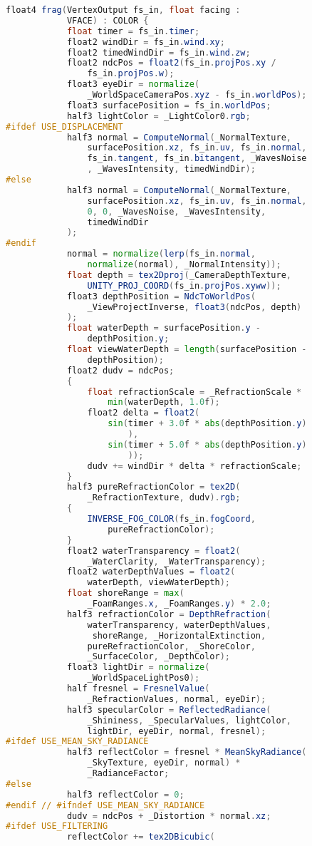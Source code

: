 \begin{lstlisting}[language=GLSL, caption={\label{cf:agua} \textit{Shader} de efeito de água na Unity}]
		float4 frag(VertexOutput fs_in, float facing : 
			VFACE) : COLOR {
			float timer = fs_in.timer;
			float2 windDir = fs_in.wind.xy;
			float2 timedWindDir = fs_in.wind.zw;
			float2 ndcPos = float2(fs_in.projPos.xy / 
				fs_in.projPos.w);
			float3 eyeDir = normalize(
				_WorldSpaceCameraPos.xyz - fs_in.worldPos);
			float3 surfacePosition = fs_in.worldPos;
			half3 lightColor = _LightColor0.rgb;
#ifdef USE_DISPLACEMENT
			half3 normal = ComputeNormal(_NormalTexture, 
				surfacePosition.xz, fs_in.uv, fs_in.normal, 
				fs_in.tangent, fs_in.bitangent, _WavesNoise
				, _WavesIntensity, timedWindDir);
#else
			half3 normal = ComputeNormal(_NormalTexture, 
				surfacePosition.xz, fs_in.uv, fs_in.normal, 
				0, 0, _WavesNoise, _WavesIntensity, 
				timedWindDir
			);
#endif
			normal = normalize(lerp(fs_in.normal, 
				normalize(normal), _NormalIntensity));
			float depth = tex2Dproj(_CameraDepthTexture, 
				UNITY_PROJ_COORD(fs_in.projPos.xyww));
			float3 depthPosition = NdcToWorldPos(
				_ViewProjectInverse, float3(ndcPos, depth)
			);
			float waterDepth = surfacePosition.y - 
				depthPosition.y; 
			float viewWaterDepth = length(surfacePosition - 
				depthPosition); 
			float2 dudv = ndcPos;
			{
				float refractionScale = _RefractionScale * 
					min(waterDepth, 1.0f);
				float2 delta = float2(
					sin(timer + 3.0f * abs(depthPosition.y)
						),
					sin(timer + 5.0f * abs(depthPosition.y)
						));
				dudv += windDir * delta * refractionScale;
			}
			half3 pureRefractionColor = tex2D(
				_RefractionTexture, dudv).rgb;
			{
				INVERSE_FOG_COLOR(fs_in.fogCoord, 
					pureRefractionColor);
			}
			float2 waterTransparency = float2(
				_WaterClarity, _WaterTransparency);
			float2 waterDepthValues = float2(
				waterDepth, viewWaterDepth);
			float shoreRange = max(
				_FoamRanges.x, _FoamRanges.y) * 2.0;
			half3 refractionColor = DepthRefraction(
				waterTransparency, waterDepthValues, 
				 shoreRange, _HorizontalExtinction,
				pureRefractionColor, _ShoreColor, 
				_SurfaceColor, _DepthColor);
			float3 lightDir = normalize(
				_WorldSpaceLightPos0);
			half fresnel = FresnelValue(
				_RefractionValues, normal, eyeDir);
			half3 specularColor = ReflectedRadiance(
				_Shininess, _SpecularValues, lightColor, 
				lightDir, eyeDir, normal, fresnel);
#ifdef USE_MEAN_SKY_RADIANCE
			half3 reflectColor = fresnel * MeanSkyRadiance(
				_SkyTexture, eyeDir, normal) * 
				_RadianceFactor;
#else
			half3 reflectColor = 0;
#endif // #ifndef USE_MEAN_SKY_RADIANCE
			dudv = ndcPos + _Distortion * normal.xz;
#ifdef USE_FILTERING
			reflectColor += tex2DBicubic(

\end{lstlisting}
